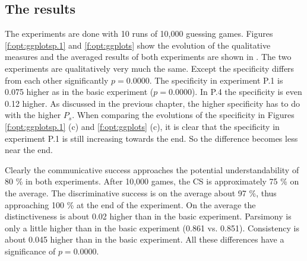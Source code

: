\subsection{The results}

The experiments are done with 10 runs of 10,000 guessing games. Figures \ref{f:opt:ggplotsp.1} and \ref{f:opt:ggplots} show the evolution of the qualitative measures and the averaged results of both experiments are shown in . The two experiments are qualitatively very much the same. Except the specificity differs from each other significantly $p=0.0000$. The specificity in experiment P.1 is 0.075 higher as in the basic experiment ($p=0.0000$). In P.4 the specificity is even 0.12 higher. As discussed in the previous chapter, the higher specificity has to do with the higher $P_s$. When comparing the evolutions of the specificity in Figures \ref{f:opt:ggplotsp.1} (c) and \ref{f:opt:ggplots} (c), it is clear that the specificity in experiment P.1 is still increasing towards the end. So the difference becomes less near the end.

Clearly the communicative success approaches the potential understandability of 80 \% in both experiments. After 10,000 games, the CS is approximately 75 \% on the average. The discriminative success is on the average about 97 \%, thus approaching 100 \% at the end of the experiment. On the average the distinctiveness is about 0.02 higher than in the basic experiment. Parsimony is only a little higher than in the basic experiment (0.861 vs. 0.851). Consistency is about 0.045 higher than in the basic experiment. All these differences have a significance of $p=0.0000$.

